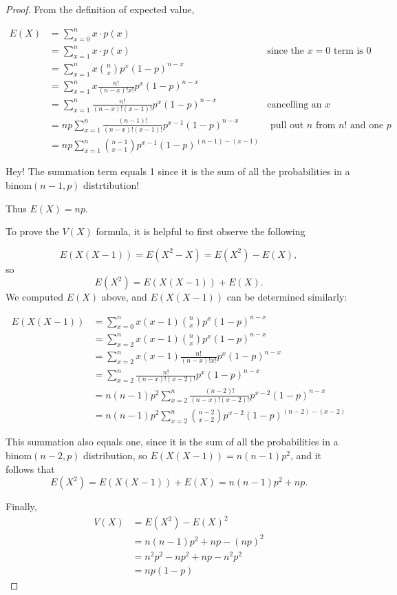 \documentclass[
]{book}
\theoremstyle{definition}
\theoremstyle{definition}
\theoremstyle{definition}
\theoremstyle{definition}
\theoremstyle{remark}
\begin{document}
\begin{proof}
From the definition of expected value,

\begin{align*}
E(X) &= \sum_{x=0}^n x \cdot p(x) \\
     &= \sum_{x=1}^n x \cdot p(x) & \text{since the } x = 0 \text{ term is  } 0 \\
     &= \sum_{x=1}^n x \binom{n}{x} p^x (1-p)^{n-x} \\
     &= \sum_{x=1}^n x \frac{n!}{(n-x)!x!} p^x (1-p)^{n-x} \\
     &= \sum_{x=1}^n \frac{n!}{(n-x)!(x-1)!} p^x (1-p)^{n-x} &\text{cancelling an } x\\
     &= np \sum_{x=1}^n \frac{(n-1)!}{(n-x)!(x-1)!}p^{x-1}(1-p)^{n-x} &\text{ pull out }n\text{ from }n!\text{ and one }p\\
     &= np \sum_{x=1}^n \binom{n-1}{x-1}p^{x-1}(1-p)^{(n-1)-(x-1)}
\end{align*}

Hey! The summation term equals 1 since it is the sum of all the probabilities in a binom\((n-1,p)\) distrtibution!

Thus \(E(X) = np\).

To prove the \(V(X)\) formula, it is helpful to first observe the following

\[E(X(X-1)) = E(X^2-X) = E(X^2)-E(X),\] so
\[E(X^2) = E(X(X-1))+E(X).\]
We computed \(E(X)\) above, and \(E(X(X-1))\) can be determined similarly:

\begin{align*}
E(X(X-1)) &= \sum_{x=0}^n x(x-1)\binom{n}{x}p^x(1-p)^{n-x} \\
          &= \sum_{x=2}^n x(x-1)\binom{n}{x}p^x(1-p)^{n-x} \\
          &= \sum_{x=2}^n x(x-1)\frac{n!}{(n-x)!x!}p^x(1-p)^{n-x} \\
          &= \sum_{x=2}^n \frac{n!}{(n-x)!(x-2)!}p^x(1-p)^{n-x} \\
          &= n(n-1)p^2 \sum_{x=2}^n \frac{(n-2)!}{(n-x)!(x-2)!}p^{x-2}(1-p)^{n-x} \\
          &= n(n-1)p^2 \sum_{x=2}^n\binom{n-2}{x-2}p^{x-2}(1-p)^{(n-2)-(x-2)}
\end{align*}

This summation also equals one, since it is the sum of all the probabilities in a binom\((n-2,p)\) distribution, so \(E(X(X-1)) = n(n-1)p^2\), and it follows that
\[E(X^2) = E(X(X-1))+E(X) = n(n-1)p^2 + np.\]

Finally,
\begin{align*} 
V(X) &= E(X^2) - E(X)^2 \\
     &= n(n-1)p^2 + np - (np)^2 \\
     &= n^2p^2 - np^2 + np - n^2p^2 \\
     &= np(1-p)
\end{align*}
\end{proof}
\end{document}
